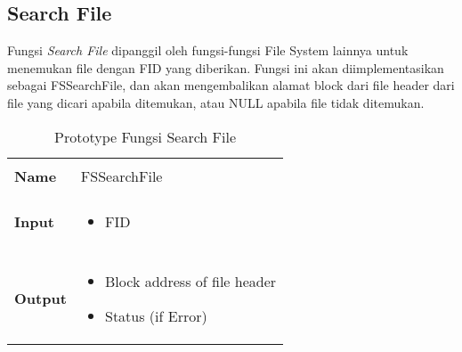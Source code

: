 \documentclass[a4paper, 12pt]{report}
\begin{document}




\subsection{Search File}

Fungsi {\em Search File} dipanggil oleh fungsi-fungsi File System lainnya untuk menemukan file dengan FID yang diberikan. Fungsi ini akan diimplementasikan sebagai FSSearchFile, dan akan mengembalikan alamat block dari file header dari file yang dicari apabila ditemukan, atau NULL apabila file tidak ditemukan.

\begin{table}[h]
  \centering
  \begin{tabular}{p{2cm} p{8cm}}
    \hline\\
    {\bf Name} & FSSearchFile\\
    \hline\\
    {\bf Input} & 
    \begin{itemize}[noitemsep,topsep=0pt,parsep=0pt,partopsep=0pt]
    \item FID
    \end{itemize}
    \\
    \hline\\
    {\bf Output} & 
    \begin{itemize}[noitemsep,topsep=0pt,parsep=0pt,partopsep=0pt]
    \item Block address of file header
    \item Status (if Error)
    \end{itemize}
    \\
    \hline
  \end{tabular}
  \caption{Prototype Fungsi Search File}
  \label{tbl-search-file}
\end{table}
\end{document}
